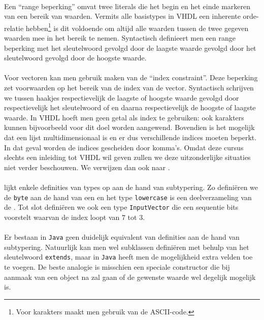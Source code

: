 \paragraph{}
Een ``range beperking'' omvat twee literals die het begin en het einde markeren van een bereik van waarden. Vermits alle basistypes in VHDL een inherente orde-relatie hebben\footnote{Voor karakters maakt men gebruik van de ASCII-code.} is dit voldoende om altijd alle waarden tussen de twee gegeven waarden mee in het bereik te nemen. Syntactisch definieert men een range beperking met het sleutelwoord  gevolgd door de laagste waarde gevolgd door het sleutelwoord  gevolgd door de hoogste waarde.

\paragraph{}
Voor vectoren kan men gebruik maken van de ``index constraint''. Deze beperking zet voorwaarden op het bereik van de index van de vector. Syntactisch schrijven we tussen haakjes respectievelijk de laagste of hoogste waarde gevolgd door respectievelijk het sleutelwoord  of  en daarna respectievelijk de hoogste of laagste waarde. In VHDL hoeft men geen getal als index te gebruiken: ook karakters kunnen bijvoorbeeld voor dit doel worden aangewend. Bovendien is het mogelijk dat een lijst multidimensionaal is en er dus verschillende indices moeten beperkt. In dat geval worden de indices gescheiden door komma's. Omdat deze cursus slechts een inleiding tot VHDL wil geven zullen we deze uitzonderlijke situaties niet verder beschouwen. We verwijzen dan ook naar \cite{hardi00}.

\paragraph{}
 lijkt enkele definities van types op aan de hand van subtypering. Zo defini\"eren we de \texttt{byte} aan de hand van een  en het type \texttt{lowercase} is een deelverzameling van de . Tot slot defini\"eren we ook een type \texttt{InputVector} die een sequentie bits voorstelt waarvan de index loopt van $7$ tot $3$.


\paragraph{}
Er bestaan in \texttt{Java} geen duidelijk equivalent van definities aan de hand van subtypering. Natuurlijk kan men wel subklassen defini\"eren met behulp van het sleutelwoord \texttt{extends}, maar in \texttt{Java} heeft men de mogelijkheid extra velden toe te voegen. De beste analogie is misschien een speciale constructor die bij aanmaak van een object na zal gaan of de gewenste waarde wel degelijk mogelijk is.

